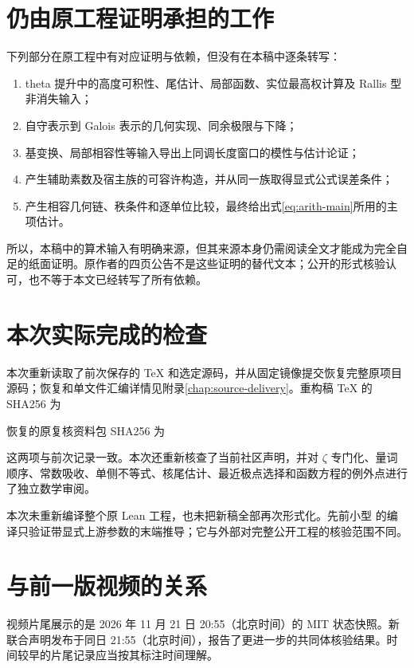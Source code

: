\section{仍由原工程证明承担的工作}
下列部分在原工程中有对应证明与依赖，但没有在本稿中逐条转写：
\begin{enumerate}
\item theta 提升中的高度可积性、尾估计、局部函数、实位最高权计算及 Rallis 型非消失输入；
\item 自守表示到 Galois 表示的几何实现、同余极限与下降；
\item 基变换、局部相容性等输入导出上同调长度窗口的模性与估计论证；
\item 产生辅助素数及宿主族的可容许构造，并从同一族取得显式公式误差条件；
\item 产生相容几何链、秩条件和逐单位比较，最终给出式\eqref{eq:arith-main}所用的主项估计。
\end{enumerate}

所以，本稿中的算术输入有明确来源，但其来源本身仍需阅读全文才能成为完全自足的纸面证明。原作者的四页公告不是这些证明的替代文本；公开的形式核验认可，也不等于本文已经转写了所有依赖。

\section{本次实际完成的检查}
本次重新读取了前次保存的 TeX 和选定源码，并从固定镜像提交恢复完整原项目源码；恢复和单文件汇编详情见附录\ref{chap:source-delivery}。重构稿 TeX 的 SHA256 为
\begin{quote}\small
{}
\end{quote}
恢复的原复核资料包 SHA256 为
\begin{quote}\small
{}
\end{quote}
这两项与前次记录一致。本次还重新核查了当前社区声明，并对 $\zeta$ 专门化、量词顺序、常数吸收、单侧不等式、核尾估计、最近极点选择和函数方程的例外点进行了独立数学审阅。

本次未重新编译整个原 Lean 工程，也未把新稿全部再次形式化。先前小型  的编译只验证带显式上游参数的末端推导；它与外部对完整公开工程的核验范围不同。

\section{与前一版视频的关系}
视频片尾展示的是 2026 年 11 月 21 日 20:55（北京时间）的 MIT 状态快照。新联合声明发布于同日 21:55（北京时间），报告了更进一步的共同体核验结果。时间较早的片尾记录应当按其标注时间理解。

